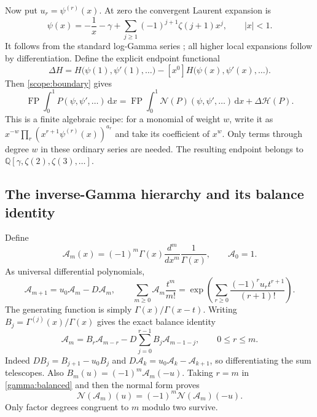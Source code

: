 \documentclass[11pt,a4paper]{article}
\numberwithin{equation}{section}
\theoremstyle{definition}
\theoremstyle{remark}
\DeclareMathOperator{\FP}{FP}
\newcommand{\dd}{\,\mathrm d}
\newcommand{\Q}{\mathbb Q}
\newcommand{\A}{\mathcal A}
\newcommand{\NN}{\mathcal N}
\newcommand{\HH}{\mathcal H}
\begin{document}
Now put $u_r=\psi^{(r)}(x)$.  At zero the convergent Laurent expansion is
\begin{equation}\label{gamma:local}
 \psi(x)=-\frac1x-\gamma+
       \sum_{j\ge1}(-1)^{j+1}\zeta(j+1)x^j,
       \qquad |x|<1.
\end{equation}
It follows from the standard log-Gamma series \cite[\S5.7]{DLMF};
all higher local expansions follow by differentiation.
Define the explicit endpoint functional
\begin{equation}\label{gamma:Delta}
 \Delta H=H\bigl(\psi(1),\psi'(1),\ldots\bigr)
             -[x^0]H\bigl(\psi(x),\psi'(x),\ldots\bigr).
\end{equation}
Then \eqref{scope:boundary} gives
\begin{equation}\label{gamma:fp-normal}
 \FP\int_0^1P(\psi,\psi',\ldots)\dd x
 =\FP\int_0^1\NN(P)(\psi,\psi',\ldots)\dd x+\Delta\HH(P).
\end{equation}
This is a finite algebraic recipe: for a monomial of weight $w$, write
it as $x^{-w}\prod_r(x^{r+1}\psi^{(r)}(x))^{a_r}$ and take its
coefficient of $x^w$.  Only terms through degree $w$ in these ordinary
series are needed.  The resulting endpoint belongs to
$\Q[\gamma,\zeta(2),\zeta(3),\ldots]$.

\subsection{The inverse-Gamma hierarchy and its balance identity}

Define
\begin{equation}\label{gamma:A}
 \A_m(x)=(-1)^m\Gamma(x)\frac{d^m}{dx^m}\frac1{\Gamma(x)},
 \qquad \A_0=1.
\end{equation}
As universal differential polynomials,
\begin{equation}\label{gamma:recurrence}
 \A_{m+1}=u_0\A_m-D\A_m,
 \qquad
 \sum_{m\ge0}\A_m\frac{t^m}{m!}
 =\exp\left(\sum_{r\ge0}\frac{(-1)^ru_rt^{r+1}}{(r+1)!}\right).
\end{equation}
The generating function is simply $\Gamma(x)/\Gamma(x-t)$.
Writing $B_j=\Gamma^{(j)}(x)/\Gamma(x)$ gives the exact balance
identity
\begin{equation}\label{gamma:balanced}
 \A_m=B_r\A_{m-r}
       -D\sum_{j=0}^{r-1}B_j\A_{m-1-j},\qquad 0\le r\le m.
\end{equation}
Indeed $DB_j=B_{j+1}-u_0B_j$ and
$D\A_k=u_0\A_k-\A_{k+1}$, so differentiating the sum telescopes.
Also $B_m(u)=(-1)^m\A_m(-u)$.  Taking $r=m$ in
\eqref{gamma:balanced} and then the normal form proves
\begin{equation}\label{gamma:parity}
 \NN(\A_m)(u)=(-1)^m\NN(\A_m)(-u).
\end{equation}
Only factor degrees congruent to $m$ modulo two survive.
\end{document}
